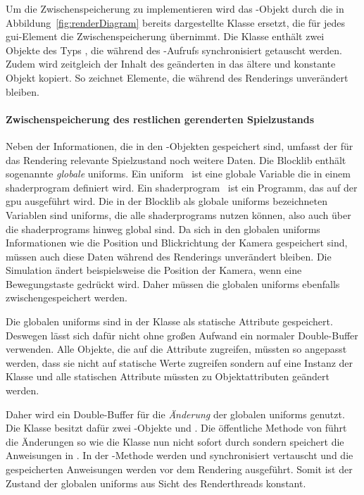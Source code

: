 Um die Zwischenspeicherung zu implementieren wird das -Objekt durch die in Abbildung~\vref{fig:renderDiagram} bereits dargestellte Klasse  ersetzt, die für jedes \ac{gui}-Element die Zwischenspeicherung übernimmt. Die Klasse enthält zwei Objekte des Typs , die während des -Aufrufs synchronisiert getauscht werden. Zudem wird zeitgleich der Inhalt des geänderten  in das ältere und konstante Objekt kopiert. So zeichnet  Elemente, die während des Renderings unverändert bleiben.


\paragraph{Zwischenspeicherung des restlichen gerenderten Spielzustands} Neben der Informationen, die in den  -Objekten gespeichert sind, umfasst der für das Rendering relevante Spielzustand noch weitere Daten. 
Die Blocklib enthält sogenannte \emph{globale} \glspl{uniform}. Ein \gls{uniform}~\cite[S.~45~ff.]{Vries2020} ist eine globale Variable die in einem \gls{shaderprogram} definiert wird. Ein \gls{shaderprogram}~\cite[S.~32~f.]{Vries2020} ist ein Programm, das auf der \ac{gpu} ausgeführt wird. Die in der Blocklib als globale \glspl{uniform} bezeichneten Variablen sind \glspl{uniform}, die alle \glspl{shaderprogram} nutzen können, also auch über die \glspl{shaderprogram} hinweg global sind. Da sich in den globalen \glspl{uniform} Informationen wie die Position und Blickrichtung der Kamera gespeichert sind, müssen auch diese Daten während des Renderings unverändert bleiben. Die Simulation ändert beispielsweise die Position der Kamera, wenn eine Bewegungstaste gedrückt wird. Daher müssen die globalen \glspl{uniform} ebenfalls zwischengespeichert werden.

Die globalen \glspl{uniform} sind in der Klasse  als statische Attribute gespeichert. Deswegen lässt sich dafür nicht ohne großen Aufwand ein normaler Double-Buffer verwenden. Alle Objekte, die auf die Attribute zugreifen, müssten so angepasst werden, dass sie nicht auf statische Werte zugreifen sondern auf eine Instanz der Klasse und alle statischen Attribute müssten zu Objektattributen geändert werden.

Daher wird ein Double-Buffer für die \emph{Änderung} der globalen \glspl{uniform} genutzt. Die Klasse  besitzt dafür zwei -Objekte  und . Die öffentliche Methode  von  führt die Änderungen so wie die Klasse  nun nicht sofort durch sondern speichert die Anweisungen in . In der -Methode werden  und  synchronisiert vertauscht und die gespeicherten Anweisungen werden vor dem Rendering ausgeführt. Somit ist der Zustand der globalen \glspl{uniform} aus Sicht des Renderthreads konstant.

